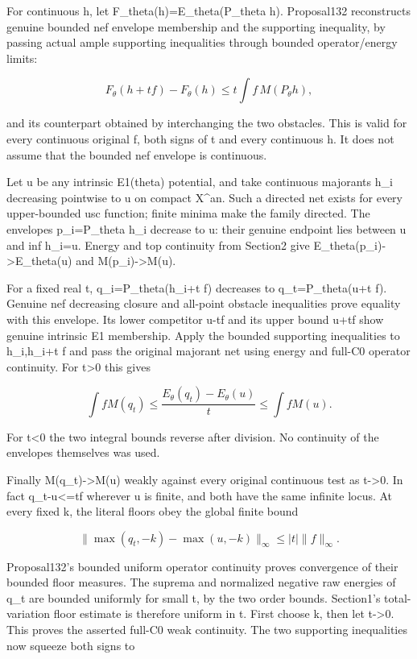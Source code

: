 \documentclass[
  10pt,
]{article}
\begin{document}
For continuous h, let F\_theta(h)=E\_theta(P\_theta h). Proposal132
reconstructs genuine bounded nef envelope membership and the supporting
inequality, by passing actual ample supporting inequalities through
bounded operator/energy limits:

\[F_\theta(h+t f)-F_\theta(h)
\le t\int f\,M(P_\theta h),\]

and its counterpart obtained by interchanging the two obstacles. This is
valid for every continuous original f, both signs of t and every
continuous h. It does not assume that the bounded nef envelope is
continuous.

Let u be any intrinsic E1(theta) potential, and take continuous
majorants h\_i decreasing pointwise to u on compact X\^{}an. Such a
directed net exists for every upper-bounded usc function; finite minima
make the family directed. The envelopes p\_i=P\_theta h\_i decrease to
u: their genuine endpoint lies between u and inf h\_i=u. Energy and top
continuity from Section2 give E\_theta(p\_i)-\textgreater E\_theta(u)
and M(p\_i)-\textgreater M(u).

For a fixed real t, q\_i=P\_theta(h\_i+t f) decreases to
q\_t=P\_theta(u+t f). Genuine nef decreasing closure and all-point
obstacle inequalities prove equality with this envelope. Its lower
competitor u-\textbar t\textbar\textbar\textbar f\textbar\textbar{} and
its upper bound u+\textbar t\textbar\textbar\textbar f\textbar\textbar{}
show genuine intrinsic E1 membership. Apply the bounded supporting
inequalities to h\_i,h\_i+t f and pass the original majorant net using
energy and full-C0 operator continuity. For t\textgreater0 this gives

\[\int fM(q_t)\le
\frac{E_\theta(q_t)-E_\theta(u)}t
\le\int fM(u).\]

For t\textless0 the two integral bounds reverse after division. No
continuity of the envelopes themselves was used.

Finally M(q\_t)-\textgreater M(u) weakly against every original
continuous test as t-\textgreater0. In fact
\textbar q\_t-u\textbar\textless=\textbar t\textbar\textbar\textbar f\textbar\textbar{}
wherever u is finite, and both have the same infinite locus. At every
fixed k, the literal floors obey the global finite bound

\[\|\max(q_t,-k)-\max(u,-k)\|_\infty\le |t|\|f\|_\infty.\]

Proposal132's bounded uniform operator continuity proves convergence of
their bounded floor measures. The suprema and normalized negative raw
energies of q\_t are bounded uniformly for small t, by the two order
bounds. Section1's total-variation floor estimate is therefore uniform
in t. First choose k, then let t-\textgreater0. This proves the asserted
full-C0 weak continuity. The two supporting inequalities now squeeze
both signs to
\end{document}
